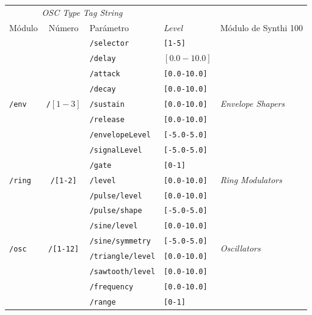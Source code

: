\begin{table}
	\begin{center}
		\begin{tabular}{ l c l l l }
			\multicolumn{3}{c}{\textit{OSC Type Tag String}} \\
			\cline{1-3}
			Módulo			& Número			& Parámetro				& \textit{Level} 	& Módulo de Synthi 100 \\
			
			\hline 
			\multirow{9}{*}{\texttt{/env}}	& \multirow{9}{*}{\texttt{/$[1-3]$}}
			& \texttt{/selector}	&\texttt{[1-5]} & \multirow{9}{*}{\textit{Envelope Shapers}}\\
			& & \texttt{/delay} & $[0.0-10.0]$ & \\
			& & \texttt{/attack} & \texttt{[0.0-10.0]} & \\
			& & \texttt{/decay} & \texttt{[0.0-10.0]} &\\
			& & \texttt{/sustain} & \texttt{[0.0-10.0]}  &\\
			& & \texttt{/release} & \texttt{[0.0-10.0]} &\\
			& & \texttt{/envelopeLevel} & \texttt{[-5.0-5.0]} &\\
			& & \texttt{/signalLevel} & \texttt{[-5.0-5.0]} &\\
			& & \texttt{/gate} & \texttt{[0-1]} &\\
			\hline
			
			\multirow{1}{*}{\texttt{/ring}}	& \multirow{1}{*}{\texttt{/[1-2]}}	& \texttt{/level}	&\texttt{[0.0-10.0]} & \multirow{1}{*}{\textit{Ring Modulators}}\\
			\hline
			
			\hline 
			\multirow{8}{*}{\texttt{/osc}}	& \multirow{8}{*}{\texttt{/[1-12]}}	& \texttt{/pulse/level}	&\texttt{[0.0-10.0]} & \multirow{8}{*}{\textit{Oscillators}}\\
			& & \texttt{/pulse/shape} & \texttt{[-5.0-5.0]} & \\
			& & \texttt{/sine/level} & \texttt{[0.0-10.0]} & \\
			& & \texttt{/sine/symmetry} & \texttt{[-5.0-5.0]} &\\
			& & \texttt{/triangle/level} & \texttt{[0.0-10.0]}  &\\
			& & \texttt{/sawtooth/level} & \texttt{[0.0-10.0]} &\\
			& & \texttt{/frequency} & \texttt{[0.0-10.0]} &\\
			& & \texttt{/range} & \texttt{[0-1]} &\\
			

\end{tabular}
\end{center}
\end{table}
